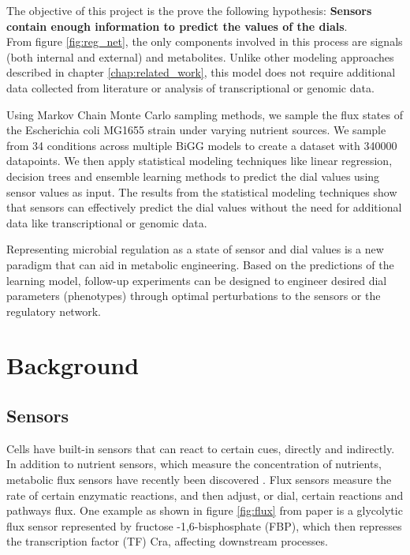 \documentclass[12pt,chapterheads]{ucsd}
\begin{document}
The objective of this project is the prove the following hypothesis:
\textbf{Sensors contain enough information to predict the values of the dials}.\\
From figure \ref{fig:reg_net}, the only components involved in this process are signals (both internal and external) and metabolites. Unlike other modeling approaches described in chapter \ref{chap:related_work}, this model does not require additional data collected from literature or analysis of transcriptional or genomic data.

Using Markov Chain Monte Carlo sampling methods, we sample the flux states of the Escherichia coli MG1655 strain under varying nutrient sources. We sample from 34 conditions across multiple BiGG models to create a dataset with 340000 datapoints. We then apply statistical modeling techniques like linear regression, decision trees and ensemble learning methods to predict the dial values using sensor values as input. The results from the statistical modeling techniques show that sensors can effectively predict the dial values without the need for additional data like transcriptional or genomic data.

Representing microbial regulation as a state of sensor and dial values is a new paradigm that can aid in metabolic engineering. Based on the predictions of the learning model, follow-up experiments can be designed to engineer desired dial parameters (phenotypes) through optimal perturbations to the sensors or the regulatory network.


\chapter{Background}

\section{Sensors}
Cells have built-in sensors that can react to certain cues, directly and indirectly. In addition to nutrient sensors, which measure the concentration of nutrients, metabolic flux sensors have recently been discovered \cite{Kochanowski1130}. Flux sensors measure the rate of certain enzymatic reactions, and then adjust, or dial, certain reactions and pathways flux. One example as shown in figure \ref{fig:flux} from \cite{Kochanowski1130} paper is a glycolytic flux sensor represented by fructose -1,6-bisphosphate (FBP), which then represses the transcription factor (TF) Cra, affecting downstream processes. 
\end{document}
